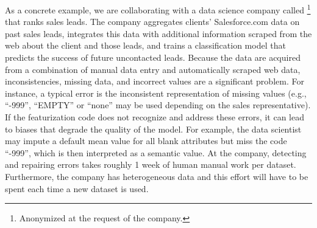 As a concrete example, we are collaborating with a data science company called \company\footnote{Anonymized at the request of the company.} that ranks sales leads. The company aggregates clients' Salesforce.com data on past sales leads, integrates this data with additional information scraped from the web about the client and those leads, and trains a classification model that predicts the success of future uncontacted leads.  Because the data are acquired from a combination of manual data entry and automatically scraped web data, inconsistencies, missing data, and incorrect values are a significant problem.  For instance, a typical error is the inconsistent representation of missing values (e.g., ``-999'', ``EMPTY'' or ``none'' may be used depending on the sales representative).  If the featurization code does not recognize and address these errors, it can lead to biases that degrade the quality of the model. For example, the data scientist may impute a default mean value for all blank attributes but miss the code ``-999'', which is then interpreted as a semantic value. 
At the company, detecting and repairing errors takes roughly 1 week of human manual work per dataset. 
Furthermore, the company has heterogeneous data and this effort will have to be spent each time a new dataset is used.

